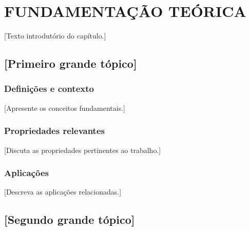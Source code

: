%

\chapter{FUNDAMENTAÇÃO TEÓRICA}
\label{cap:fundamentacao}

[Texto introdutório do capítulo.]

\section{[Primeiro grande tópico]}
\label{sec:topico-1}

\subsection{Definições e contexto}
\label{sec:topico-1-def}

[Apresente os conceitos fundamentais.]

\subsection{Propriedades relevantes}
\label{sec:topico-1-prop}

[Discuta as propriedades pertinentes ao trabalho.]

\subsection{Aplicações}
\label{sec:topico-1-apl}

[Descreva as aplicações relacionadas.]

\section{[Segundo grande tópico]}
\label{sec:topico-2}

